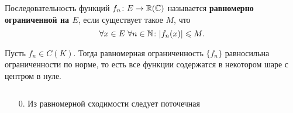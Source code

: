 \begin{defn}
	Последовательность функций $ f_n \colon E \to \mathbb{R} (\mathbb{C})$ называется {\bf равномерно ограниченной на $ E$}, если существует такое $ M$, что
	\[
		\forall x \in E ~ \forall n \in \mathbb{N} \colon \lvert f_n(x) \rvert \leqslant M
	.\]
\end{defn}

\begin{ex}
	Пусть $ f_n \in C(K)$. Тогда равномерная ограниченность $ \{f_n\}$ равносильна ограниченности по норме, то есть все функции содержатся в некотором шаре с центром в нуле.
\end{ex}

\begin{prop}
	$ $
	\begin{enumerate}
		\item[0.] Из равномерной сходимости следует поточечная


\end{enumerate}
\end{prop}
